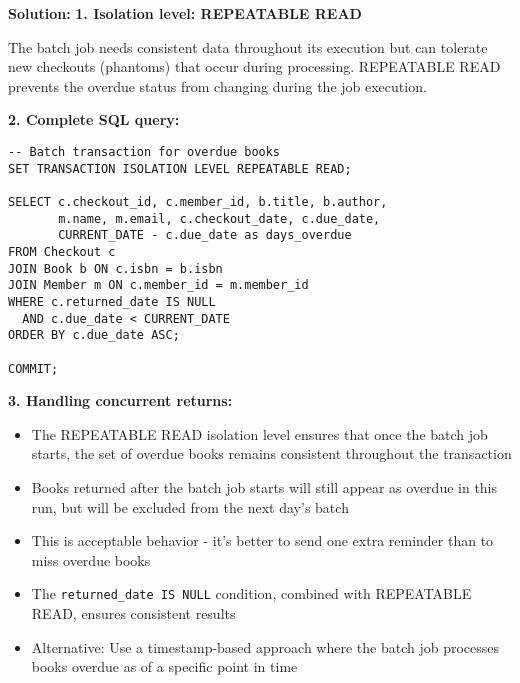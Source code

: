 \documentclass{article}
\begin{document}
\textbf{Solution:}
\textbf{1. Isolation level: REPEATABLE READ}

The batch job needs consistent data throughout its execution but can tolerate new checkouts (phantoms) that occur during processing. REPEATABLE READ prevents the overdue status from changing during the job execution.

\textbf{2. Complete SQL query:}
\begin{verbatim}
-- Batch transaction for overdue books
SET TRANSACTION ISOLATION LEVEL REPEATABLE READ;

SELECT c.checkout_id, c.member_id, b.title, b.author, 
       m.name, m.email, c.checkout_date, c.due_date,
       CURRENT_DATE - c.due_date as days_overdue
FROM Checkout c
JOIN Book b ON c.isbn = b.isbn  
JOIN Member m ON c.member_id = m.member_id
WHERE c.returned_date IS NULL 
  AND c.due_date < CURRENT_DATE
ORDER BY c.due_date ASC;

COMMIT;
\end{verbatim}

\textbf{3. Handling concurrent returns:}
\begin{itemize}
    \item The REPEATABLE READ isolation level ensures that once the batch job starts, the set of overdue books remains consistent throughout the transaction
    \item Books returned after the batch job starts will still appear as overdue in this run, but will be excluded from the next day's batch
    \item This is acceptable behavior - it's better to send one extra reminder than to miss overdue books
    \item The \texttt{returned\_date IS NULL} condition, combined with REPEATABLE READ, ensures consistent results
    \item Alternative: Use a timestamp-based approach where the batch job processes books overdue as of a specific point in time
\end{itemize}


\newpage
\end{document}
